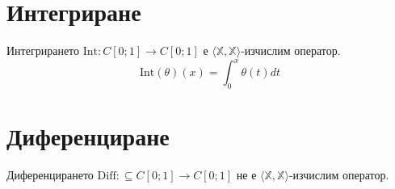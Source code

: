 \section{Интегриране}
Интегрирането $\text{Int}: C[0;1] \to C[0;1]$ е $\langle\mathbb X, \mathbb X\rangle$-изчислим оператор.
\begin{equation}
    \text{Int}(\theta)(x) = \int_0^x\theta(t)dt
\end{equation}

\section{Диференциране}
Диференцирането $\text{Diff}: \subseteq C[0; 1] \to C[0;1]$ не е $\langle\mathbb X, \mathbb X\rangle$-изчислим оператор.